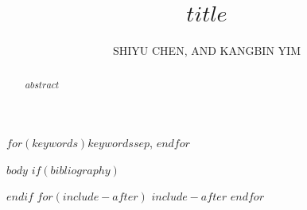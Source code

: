 \documentclass{ieeeaccess}
\begin{document}
\title{$title$}
\author{\uppercase{Shiyu Chen}, AND
\uppercase{Kangbin Yim}}
\address[1]{Department of Software Convergence, Soonchunhyang University,
Asan 31538, Republic of Korea (e-mail: chen@sch.ac.kr)}
\address[2]{Department of Information Security, Soonchunhyang University,
Asan 31538, Republic of Korea (e-mail: yim@sch.ac.kr)}
\begin{abstract}
$abstract$
\end{abstract}
\begin{keywords}
$for(keywords)$$keywords$$sep$, $endfor$
\end{keywords}
\titlepgskip=-21pt
\maketitle
$body$
$if(bibliography)$


$endif$
$for(include-after)$
$include-after$
$endfor$
\EOD
\end{document}
